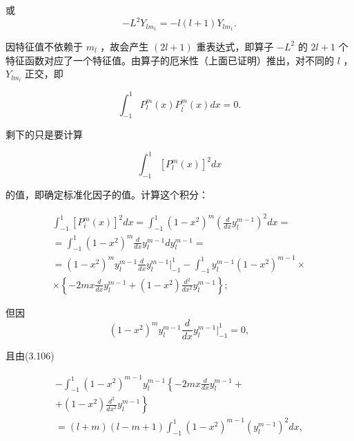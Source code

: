 或
\begin{equation*}
- L ^ {2} Y _ {l m _ {1}} = - l (l + 1) Y _ {l m _ {1}}.
\end{equation*}

因特征值不依赖于 $m_{l}$ ，故会产生 $(2l + 1)$ 重表达式，即算子 $-L^{2}$ 的 $2l + 1$ 个特征函数对应了一个特征值。由算子的厄米性（上面已证明）推出，对不同的 $l$ ， $Y_{lm_l}$ 正交，即

\begin{equation*}
\int_ {- 1} ^ {1} P _ {l} ^ {m} (x) P _ {l ^ {\prime}} ^ {m} (x) d x = 0.
\end{equation*}

剩下的只是要计算

\begin{equation*}
\int_ {- 1} ^ {1} \left[ P _ {l} ^ {m} (x) \right] ^ {2} d x
\end{equation*}

的值，即确定标准化因子的值。计算这个积分：

\begin{equation*}
\begin{array}{l} \int_ {- 1} ^ {1} [ P _ {i} ^ {m} (x) ] ^ {2} d x = \int_ {- 1} ^ {1} (1 - x ^ {2}) ^ {m} \left(\frac {d}{d x} y _ {l} ^ {m - 1}\right) ^ {2} d x = \\ = \int_ {- 1} ^ {1} (1 - x ^ {2}) ^ {m} \frac {d}{d x} y _ {l} ^ {m - 1} d y _ {l} ^ {m - 1} = \\ = (1 - x ^ {2}) ^ {m} y _ {l} ^ {m - 1} \frac {d}{d x} y _ {l} ^ {m - 1} \Bigg | _ {- 1} ^ {1} - \int_ {- 1} ^ {1} y _ {l} ^ {m - 1} (1 - x ^ {2}) ^ {m - 1} \times \\ \times \left\{- 2 m x \frac {d}{d x} y _ {l} ^ {m - 1} + (1 - x ^ {2}) \frac {d ^ {2}}{d x ^ {2}} y _ {l} ^ {m - 1} \right\}; \end{array}\tag{3.114}
\end{equation*}

但因
\begin{equation*}
\left(1 - x ^ {2}\right) ^ {m} y _ {l} ^ {m - 1} \frac {d}{d x} y _ {l} ^ {m - 1} \Bigg | _ {- 1} ^ {1} = 0,
\end{equation*}

且由(3.106)

\begin{equation*}
\begin{array}{l} - \int_ {- 1} ^ {1} (1 - x ^ {2}) ^ {m - 1} y _ {l} ^ {m - 1} \left\{- 2 m x \frac {d}{d x} y _ {l} ^ {m - 1} + \right. \\ \left. + (1 - x ^ {2}) \frac {d ^ {2}}{d x ^ {2}} y _ {l} ^ {m - 1} \right\} \\ = (l + m) (l - m + 1) \int_ {- 1} ^ {1} (1 - x ^ {2}) ^ {m - 1} (y _ {l} ^ {m - 1}) ^ {2} d x, \end{array}
\end{equation*}

